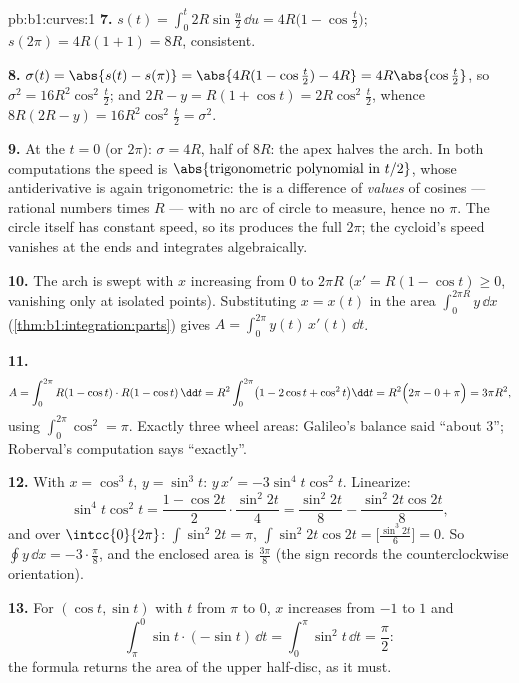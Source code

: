 \begin{solution}{pb:b1:curves:1}
\textbf{7.} $s(t) = \int_0^t 2R\sin\frac u2\,\dd u =
4R\bigl(1 - \cos\frac t2\bigr)$; $s(2\pi) = 4R(1+1) = 8R$,
consistent.

\textbf{8.} $\sigma(t) = \abs{s(t) - s(\pi)} = \abs{4R(1 -
\cos\frac t2) - 4R} = 4R\abs{\cos\frac t2}$, so $\sigma^2 =
16R^2\cos^2\frac t2$; and $2R - y = R(1 + \cos t) =
2R\cos^2\frac t2$, whence $8R(2R - y) = 16R^2\cos^2\frac t2 =
\sigma^2$.

\textbf{9.} At the  $t = 0$ (or $2\pi$): $\sigma = 4R$, half
of $8R$: the apex halves the arch. In both computations the
speed is $\abs{\text{trigonometric polynomial in } t/2}$, whose
antiderivative is again trigonometric: the  is a
difference of \emph{values} of cosines --- rational numbers
times $R$ --- with no arc of circle to measure, hence no $\pi$.
The circle itself has constant speed, so its  
produces the full   $2\pi$; the cycloid's speed
vanishes at the ends and integrates algebraically.

\textbf{10.} The arch is swept with $x$ increasing from $0$ to
$2\pi R$ ($x' = R(1 - \cos t) \geq 0$, vanishing only at
isolated points). Substituting $x = x(t)$ in the area 
$\int_0^{2\pi R} y\,\dd x$ (\cref{thm:b1:integration:parts})
gives $A = \int_0^{2\pi} y(t)\,x'(t)\,\dd t$.

\textbf{11.}
\[
A = \int_0^{2\pi} R(1 - \cos t)\cdot R(1 - \cos t)\,\dd t
= R^2\int_0^{2\pi}\bigl(1 - 2\cos t + \cos^2 t\bigr)\dd t
= R^2\Bigl(2\pi - 0 + \pi\Bigr) = 3\pi R^2 ,
\]
using $\int_0^{2\pi}\cos^2 = \pi$. Exactly three wheel areas:
Galileo's balance said ``about $3$''; Roberval's computation
says ``exactly''.

\textbf{12.} With $x = \cos^3 t$, $y = \sin^3 t$: $y\,x' =
-3\sin^4 t\cos^2 t$. Linearize:
\[
\sin^4 t\cos^2 t = \frac{1 - \cos 2t}{2}\cdot\frac{\sin^2
2t}{4} = \frac{\sin^2 2t}{8} - \frac{\sin^2 2t\cos 2t}{8} ,
\]
and over $\intcc{0}{2\pi}$: $\int\sin^2 2t = \pi$, $\int \sin^2
2t\cos 2t = \bigl[\frac{\sin^3 2t}{6}\bigr] = 0$. So $\oint
y\,\dd x = -3\cdot\frac\pi8$, and the enclosed area is
$\frac{3\pi}8$ (the sign records the counterclockwise
orientation).

\textbf{13.} For $(\cos t, \sin t)$ with $t$ from $\pi$ to $0$,
$x$ increases from $-1$ to $1$ and
\[
\int_\pi^0 \sin t\cdot(-\sin t)\,\dd t
= \int_0^\pi \sin^2 t\,\dd t = \frac\pi2 :
\]
the formula returns the area of the upper half-disc, as it must.


\end{solution}
